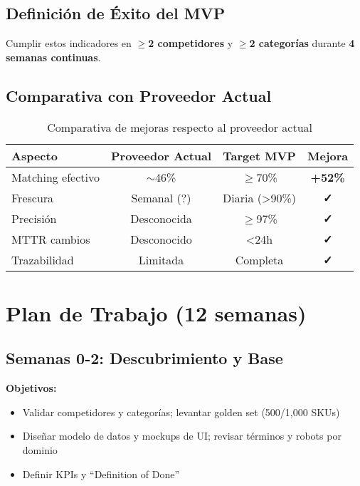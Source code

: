 \documentclass[12pt,a4paper]{article}
\begin{document}
\subsection{Definición de Éxito del MVP}

Cumplir estos indicadores en \textbf{$\geq$2 competidores} y \textbf{$\geq$2 categorías} durante \textbf{4 semanas continuas}.

\subsection{Comparativa con Proveedor Actual}

\begin{table}[h]
\centering
\begin{tabularx}{\textwidth}{|X|c|c|c|}
\hline
\textbf{Aspecto} & \textbf{Proveedor Actual} & \textbf{Target MVP} & \textbf{Mejora} \\
\hline
Matching efectivo & $\sim$46\% & $\geq$70\% & \textcolor{successgreen}{\textbf{+52\%}} \\
\hline
Frescura & Semanal (?) & Diaria (>90\%) & \textcolor{successgreen}{\textbf{✓}} \\
\hline
Precisión & Desconocida & $\geq$97\% & \textcolor{successgreen}{\textbf{✓}} \\
\hline
MTTR cambios & Desconocido & <24h & \textcolor{successgreen}{\textbf{✓}} \\
\hline
Trazabilidad & Limitada & Completa & \textcolor{successgreen}{\textbf{✓}} \\
\hline
\end{tabularx}
\caption{Comparativa de mejoras respecto al proveedor actual}
\end{table}

\section{Plan de Trabajo (12 semanas)}

\subsection{Semanas 0-2: Descubrimiento y Base}

\textbf{Objetivos:}
\begin{itemize}[leftmargin=*]
    \item Validar competidores y categorías; levantar golden set (500/1,000 SKUs)
    \item Diseñar modelo de datos y mockups de UI; revisar términos y robots por dominio
    \item Definir KPIs y ``Definition of Done''
\end{itemize}
\end{document}
